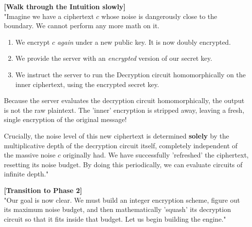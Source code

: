 \documentclass[11pt]{article}
\begin{document}
\textbf{[Walk through the Intuition slowly]} \\
"Imagine we have a ciphertext $c$ whose noise is dangerously close to the boundary. We cannot perform any more math on it.
\begin{enumerate}
    \item We encrypt $c$ \textit{again} under a new public key. It is now doubly encrypted.
    \item We provide the server with an \textit{encrypted} version of our secret key.
    \item We instruct the server to run the Decryption circuit homomorphically on the inner ciphertext, using the encrypted secret key.
\end{enumerate}
Because the server evaluates the decryption circuit homomorphically, the output is not the raw plaintext. The 'inner' encryption is stripped away, leaving a fresh, single encryption of the original message! 

Crucially, the noise level of this new ciphertext is determined \textbf{solely} by the multiplicative depth of the decryption circuit itself, completely independent of the massive noise $c$ originally had. We have successfully 'refreshed' the ciphertext, resetting its noise budget. By doing this periodically, we can evaluate circuits of infinite depth."

\textbf{[Transition to Phase 2]} \\
"Our goal is now clear. We must build an integer encryption scheme, figure out its maximum noise budget, and then mathematically 'squash' its decryption circuit so that it fits inside that budget. Let us begin building the engine."
\end{document}
